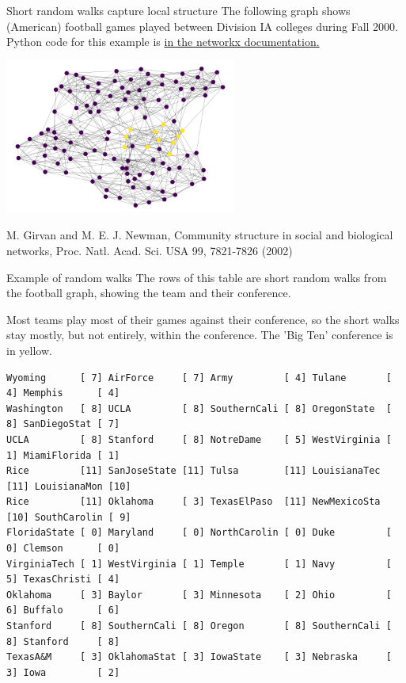 \documentclass{beamer}
\begin{document}
\begin{frame}{Short random walks capture local structure}
  The following graph shows (American) football games played between Division IA colleges during Fall 2000. Python code for this example is \href{https://networkx.github.io/documentation/stable/auto_examples/graph/plot_football.html}{in the networkx documentation.}
  \begin{center}
    \includegraphics[width=3in]{football.png}
  \end{center}
  \begin{block}{}
    \tiny{ M. Girvan and M. E. J. Newman,
      Community structure in social and biological networks,
      Proc. Natl. Acad. Sci. USA 99, 7821-7826 (2002)}
  \end{block}
\end{frame}
\begin{frame}[fragile=singleslide]{Example of random walks}
  The rows of this table are short random walks from the football graph, showing the team and their conference.  

  \bigskip\noindent
  Most teams play most of their games against their conference, so the short walks stay mostly, but not entirely, within the conference. The 'Big Ten' conference is in yellow.
  
  \tiny{
\begin{verbatim}
Wyoming      [ 7] AirForce     [ 7] Army         [ 4] Tulane       [ 4] Memphis      [ 4] 
Washington   [ 8] UCLA         [ 8] SouthernCali [ 8] OregonState  [ 8] SanDiegoStat [ 7] 
UCLA         [ 8] Stanford     [ 8] NotreDame    [ 5] WestVirginia [ 1] MiamiFlorida [ 1] 
Rice         [11] SanJoseState [11] Tulsa        [11] LouisianaTec [11] LouisianaMon [10] 
Rice         [11] Oklahoma     [ 3] TexasElPaso  [11] NewMexicoSta [10] SouthCarolin [ 9] 
FloridaState [ 0] Maryland     [ 0] NorthCarolin [ 0] Duke         [ 0] Clemson      [ 0] 
VirginiaTech [ 1] WestVirginia [ 1] Temple       [ 1] Navy         [ 5] TexasChristi [ 4] 
Oklahoma     [ 3] Baylor       [ 3] Minnesota    [ 2] Ohio         [ 6] Buffalo      [ 6] 
Stanford     [ 8] SouthernCali [ 8] Oregon       [ 8] SouthernCali [ 8] Stanford     [ 8] 
TexasA&M     [ 3] OklahomaStat [ 3] IowaState    [ 3] Nebraska     [ 3] Iowa         [ 2] 
\end{verbatim}
  }
\end{frame}
\end{document}

